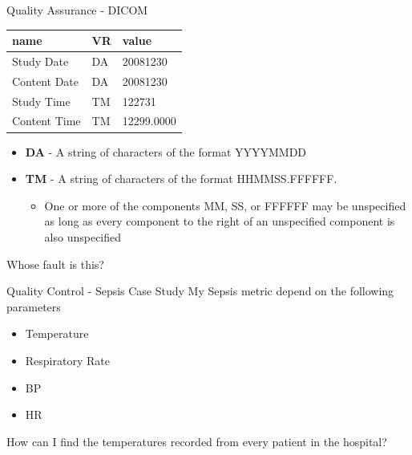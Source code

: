 \documentclass[10pt, xcolor=table]{beamer}
\begin{document}
\begin{frame}{Quality Assurance - DICOM}
\begin{center}
\begin{tabular}{lll}
\toprule
                        name &  VR &                                              value \\
\midrule
                  Study Date &  DA &                                           20081230 \\
                Content Date &  DA &                                           20081230 \\
                  Study Time &  TM &                                             122731 \\
                Content Time &  TM &                                         12299.0000 \\
\bottomrule
\end{tabular}
\end{center}
	\begin{itemize}
		\item \textbf{DA} - A string of characters of the format YYYYMMDD
		\item \textbf{TM} - A string of characters of the format HHMMSS.FFFFFF.  
		\begin{itemize}
			\item One or more of the components MM, SS, or FFFFFF may be unspecified as long as every component to the right of an unspecified component is also unspecified
		\end{itemize}		 
	\end{itemize}

	\begin{center}
		\large{Whose fault is this?}
	\end{center}
\end{frame}

\begin{frame}{Quality Control - Sepsis Case Study}
	My Sepsis metric depend on the following parameters
	\begin{itemize}
		\item Temperature
		\item Respiratory Rate
		\item BP
		\item HR
	\end{itemize}	
	\begin{center}
		How can I find the temperatures recorded from every patient in the hospital?
	\end{center}
\end{frame}
\end{document}
